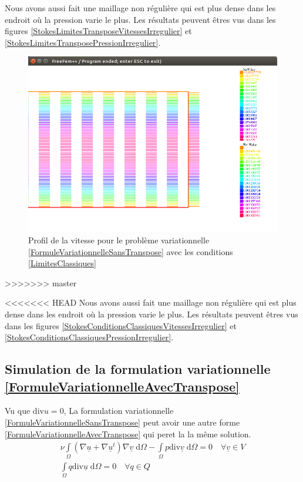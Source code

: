 \documentclass[11pt,a4paper]{article}
\numberwithin{equation}{subsection}
\numberwithin{figure}{subsection}
\begin{document}
Nous avons aussi fait une maillage non régulière qui est plus dense dans les endroit où la pression varie le plus. Les résultats peuvent êtres vus dans les figures \ref{StokesLimitesTransposeVitessesIrregulier} et \ref{StokesLimitesTransposePressionIrregulier}.

\begin{figure}[H]
\centering
\includegraphics[scale=0.4]{StokesConditionsClassiques.png}
\caption{Profil de la vitesse pour le problème variationnelle \ref{FormuleVariationnelleSansTranspose} avec les conditions \ref{LimitesClassiques}}
\label{StokesConditionsClassiques}
\end{figure}
>>>>>>> master


<<<<<<< HEAD
Nous avons aussi fait une maillage non régulière qui est plus dense dans les endroit où la pression varie le plus. Les résultats peuvent êtres vus dans les figures \ref{StokesConditionsClassiquesVitessesIrregulier} et \ref{StokesConditionsClassiquesPressionIrregulier}.


\subsection{Simulation de la formulation variationnelle \ref{FormuleVariationnelleAvecTranspose}}

Vu que $\mathrm{div} u = 0$, La formulation variationnelle \ref{FormuleVariationnelleSansTranspose} peut avoir une autre forme \ref{FormuleVariationnelleAvecTranspose} qui peret la la même solution. 
\begin{equation}
\begin{aligned}
\nu \int\limits_\Omega \left(\nabla \underline{u} + \nabla \underline{u}^t\right) \nabla \underline{v} \;\mathrm{d}\Omega - \int\limits_\Omega p\mathrm{div}\underline{v} \; \mathrm{d}\Omega = 0\quad \forall \underline{v}\in V\\
\int\limits_\Omega q \mathrm{div} \underline{u} \;\mathrm{d}\Omega = 0 \quad \forall q \in Q\\
\label{FormuleVariationnelleAvecTranspose}
\end{aligned}
\end{equation}
\end{document}
